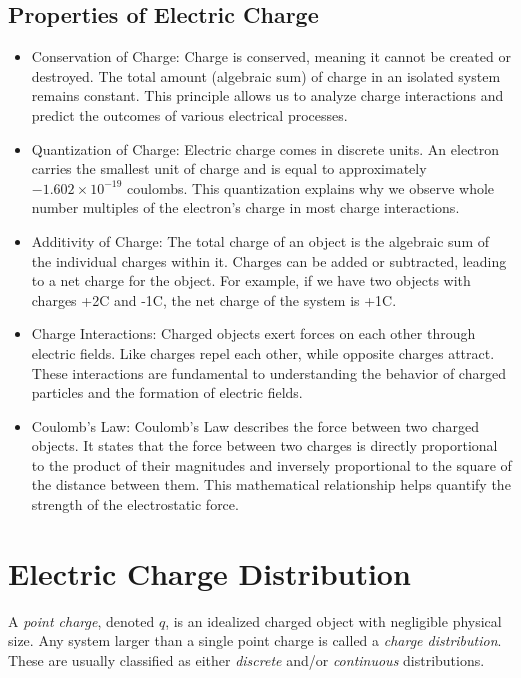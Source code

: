 \documentclass[12pt,b4paper]{article}
\begin{document}
\subsection{Properties of Electric Charge}
\begin{itemize}
    \item Conservation of Charge: Charge is conserved, meaning it cannot be created or destroyed. The total amount (algebraic sum) of charge in an isolated system remains constant. This principle allows us to analyze charge interactions and predict the outcomes of various electrical processes.
    \item Quantization of Charge: Electric charge comes in discrete units. An electron carries the smallest unit of charge and is equal to approximately $-1.602 \times 10^{-19}$ coulombs. This quantization explains why we observe whole number multiples of the electron's charge in most charge interactions.
    \item Additivity of Charge: The total charge of an object is the algebraic sum of the individual charges within it. Charges can be added or subtracted, leading to a net charge for the object. For example, if we have two objects with charges +2C and -1C, the net charge of the system is +1C.
    \item Charge Interactions: Charged objects exert forces on each other through electric fields. Like charges repel each other, while opposite charges attract. These interactions are fundamental to understanding the behavior of charged particles and the formation of electric fields.
    \item Coulomb's Law: Coulomb's Law describes the force between two charged objects. It states that the force between two charges is directly proportional to the product of their magnitudes and inversely proportional to the square of the distance between them. This mathematical relationship helps quantify the strength of the electrostatic force.
\end{itemize}
\section{Electric Charge Distribution}
A \textit{point charge}, denoted $q$, is an idealized charged object with negligible physical size. Any system larger than a single point charge is called a \textit{charge distribution}. These are usually classified as either \textit{discrete} and/or \textit{continuous} distributions.
\end{document}
